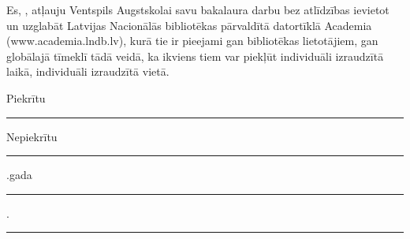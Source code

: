 \documentclass[12pt,paper=a4]{report}
\begin{document}
 Es, , atļauju Ventspils Augstskolai savu bakalaura darbu bez atlīdzības ievietot un uzglabāt Latvijas Nacionālās bibliotēkas pārvaldītā datortīklā Academia (www.academia.lndb.lv), kurā tie ir pieejami gan bibliotēkas lietotājiem, gan globālajā tīmeklī tādā veidā, ka ikviens tiem var piekļūt individuāli izraudzītā laikā, individuāli izraudzītā vietā.

\hspace{180pt} Piekrītu \hspace{15pt} \rule{5cm}{0.2pt}

\vspace{8pt}

\hspace{180pt} Nepiekrītu \hspace{2pt} \rule{5cm}{0.2pt}

\vspace{2cm}
.gada \rule{1cm}{0.2pt}.\rule{3cm}{0.2pt}
\vspace{2cm}


\label{LastPage}
\end{document}
